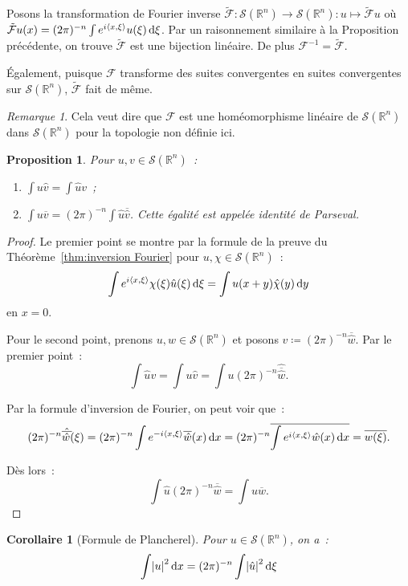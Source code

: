 \documentclass{report}
\newcommand{\R}{{\mathbb R}}
\newcommand{\scpr}[2]{\left\langle#1, #2\right\rangle}
\newcommand{\dx}{\dif x}
\newtheorem{prp}[thm]{Proposition}
\newtheorem{cor}[thm]{Corollaire}
\theoremstyle{definition}
\theoremstyle{remark}
\newtheorem*{rmq}{Remarque}
\begin{document}
Posons la transformation de Fourier inverse $\tilde {\mathcal F} : \mathcal S(\R^n) \to \mathcal S(\R^n) : u \mapsto \tilde {\mathcal F}u$ où
$\tilde {\mathcal F}u(x) = (2\pi)^{-n}\int e^{i\scpr x\xi}u(\xi)\dif\xi$. Par un raisonnement similaire à la Proposition précédente,
on trouve $\tilde {\mathcal F}$ est une bijection linéaire. De plus $\mathcal F^{-1} = \tilde {\mathcal F}$.

Également, puisque $\mathcal F$ transforme des suites convergentes en suites convergentes sur $\mathcal S(\R^n)$, $\tilde {\mathcal F}$ fait de même.

\begin{rmq} Cela veut dire que $\mathcal F$ est une homéomorphisme linéaire de $\mathcal S(\R^n)$ dans $\mathcal S(\R^n)$ pour la topologie non définie ici.
\end{rmq}

\begin{prp}\label{prp:id de Parseval} Pour $u, v \in \mathcal S(\R^n)$~:
\begin{enumerate}
	\item $\int u\hat v = \int\hat uv$~;
	\item $\int u\overline v = (2\pi)^{-n}\int \hat u\overline {\hat v}$. Cette égalité est appelée \textit{identité de Parseval}.
\end{enumerate}
\end{prp}

\begin{proof} Le premier point se montre par la formule de la preuve du Théorème~\ref{thm:inversion Fourier} pour $u,\chi \in \mathcal S(\R^n)$~:
\[\int e^{i\scpr x\xi}\chi(\xi)\hat u(\xi)\dif\xi = \int u(x+y)\hat \chi(y)\dif y\]
en $x=0$.

Pour le second point, prenons $u, w \in \mathcal S(\R^n)$ et posons $v \coloneqq (2\pi)^{-n}\overline {\hat w}$. Par le premier point~:
\[\int \hat uv = \int u\hat v = \int u(2\pi)^{-n}\hat {\overline {\hat w}}.\]

Par la formule d'inversion de Fourier, on peut voir que~:
\[(2\pi)^{-n}\hat {\overline {\hat w}}(\xi) = (2\pi)^{-n}\int e^{-i\scpr x\xi}\overline {\hat w}(x)\dx =
	(2\pi)^{-n}\overline {\int e^{i\scpr x\xi}\hat w(x)\dx} = \overline {w(\xi)}.\]

Dès lors~:
\[\int \hat u(2\pi)^{-n}\overline {\hat w} = \int u\overline w.\]
\end{proof}

\begin{cor}[Formule de Plancherel] Pour $u \in \mathcal S(\R^n)$, on a~:
\begin{equation}\label{eq:Plancherel}
	\int \abs u^2\dx = (2\pi)^{-n}\int\abs {\hat u}^2\dif\xi
\end{equation}
\end{cor}
\end{document}
